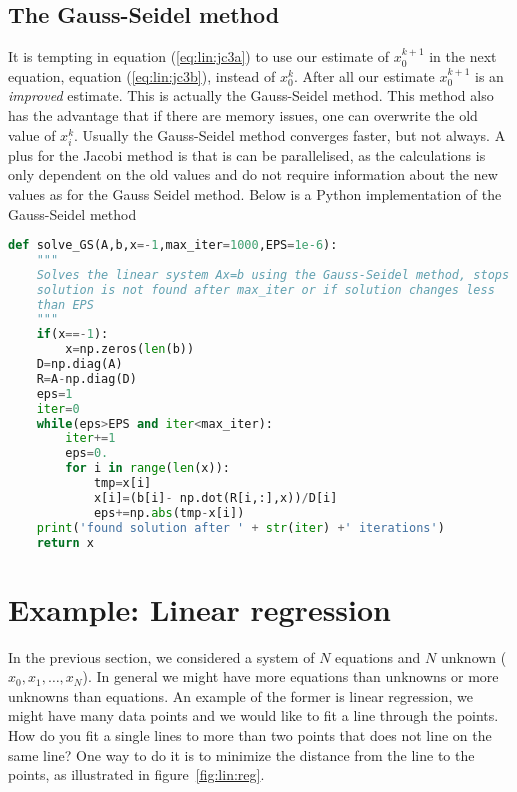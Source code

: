 \documentclass[graybox,sectrefs,envcountresetchap,open=right,final]{svmonodo}
\begin{document}
\subsection{The Gauss-Seidel method}
It is tempting in equation (\ref{eq:lin:jc3a}) to use our estimate of $x_0^{k+1}$ in the next equation, equation (\ref{eq:lin:jc3b}), instead of $x_0^k$. After all our estimate $x_0^{k+1}$ is an \emph{improved} estimate. This is actually the Gauss-Seidel method. This method also has the advantage that if there are memory issues, one can overwrite the old value of $x_i^k$. Usually the Gauss-Seidel method converges faster, but not always. A plus for the Jacobi method is that is can be  parallelised, as the calculations is only dependent on the old values and do not require information about the new values as for the Gauss Seidel method. Below is a Python implementation of the Gauss-Seidel method   























\begin{lstlisting}[language=python,style=blue1]
def solve_GS(A,b,x=-1,max_iter=1000,EPS=1e-6):
    """
    Solves the linear system Ax=b using the Gauss-Seidel method, stops if
    solution is not found after max_iter or if solution changes less 
    than EPS
    """
    if(x==-1):
        x=np.zeros(len(b))
    D=np.diag(A)
    R=A-np.diag(D)
    eps=1
    iter=0
    while(eps>EPS and iter<max_iter):
        iter+=1
        eps=0.
        for i in range(len(x)):
            tmp=x[i]
            x[i]=(b[i]- np.dot(R[i,:],x))/D[i]
            eps+=np.abs(tmp-x[i])
    print('found solution after ' + str(iter) +' iterations')
    return x

\end{lstlisting}


\section{Example: Linear regression}
In the previous section, we considered a system of $N$ equations and $N$ unknown ($x_0, x_1,\ldots, x_N$). In general we might have more equations than unknowns or more unknowns than equations. An example of the former is linear regression, we might have many data points and we would like to fit a line through the points. How do you fit a single lines to more than two points that does not line on the same line? One way to do it is to minimize the distance from the line to the points, as illustrated in figure~\ref{fig:lin:reg}.
\end{document}

